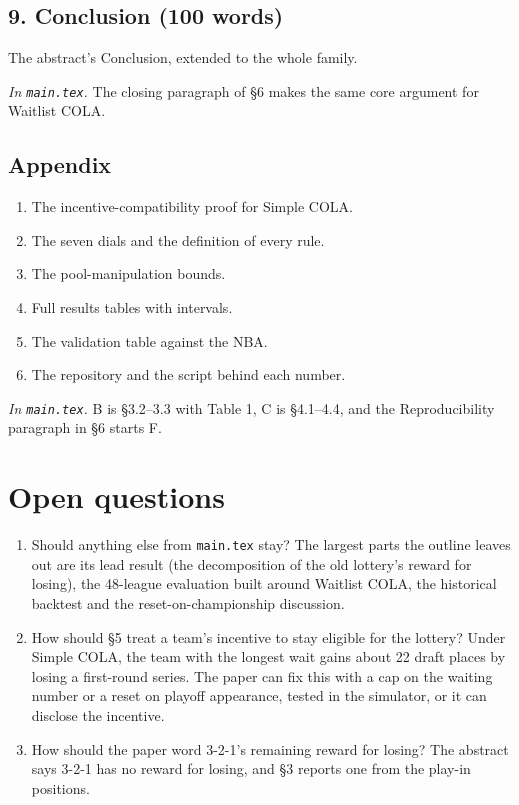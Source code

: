 \documentclass[10pt]{article}
\newcommand{\inmain}[1]{\textit{In \texttt{main.tex}.} #1\par}
\begin{document}
\subsection{9. Conclusion (100 words)}
The abstract's Conclusion, extended to the whole family.

\inmain{The closing paragraph of \S6 makes the same core argument for Waitlist COLA.}

\subsection{Appendix}
\begin{enumerate}[label=\Alph*.]
\item The incentive-compatibility proof for Simple COLA.
\item The seven dials and the definition of every rule.
\item The pool-manipulation bounds.
\item Full results tables with intervals.
\item The validation table against the NBA.
\item The repository and the script behind each number.
\end{enumerate}
\inmain{B is \S3.2--3.3 with Table 1, C is \S4.1--4.4, and the Reproducibility paragraph in \S6 starts F.}

\section{Open questions}

\begin{enumerate}
\item Should anything else from \texttt{main.tex} stay? The largest parts the outline leaves out are its lead result (the decomposition of the old lottery's reward for losing), the 48-league evaluation built around Waitlist COLA, the historical backtest and the reset-on-championship discussion.
\item How should \S5 treat a team's incentive to stay eligible for the lottery? Under Simple COLA, the team with the longest wait gains about 22 draft places by losing a first-round series. The paper can fix this with a cap on the waiting number or a reset on playoff appearance, tested in the simulator, or it can disclose the incentive.
\item How should the paper word 3-2-1's remaining reward for losing? The abstract says 3-2-1 has no reward for losing, and \S3 reports one from the play-in positions.
\end{enumerate}
\end{document}
